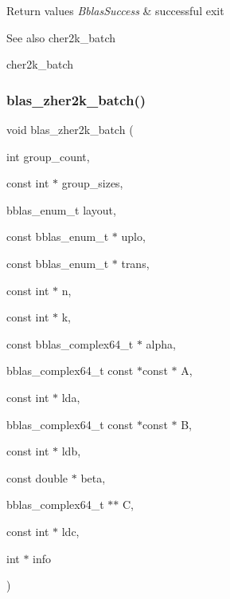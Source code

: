 \begin{DoxyRetVals}{Return values}
{\em Bblas\+Success} & successful exit\\
\hline
\end{DoxyRetVals}
\begin{DoxySeeAlso}{See also}
cher2k\+\_\+batch 

cher2k\+\_\+batch 
\end{DoxySeeAlso}
\mbox{\label{group__her2k__batch_ga5a446eb5bdf3a533959c4f1fb2247973}} 
\subsubsection{\texorpdfstring{blas\+\_\+zher2k\+\_\+batch()}{blas\_zher2k\_batch()}}
{\footnotesize\ttfamily void blas\+\_\+zher2k\+\_\+batch (\begin{DoxyParamCaption}\item[{int}]{group\+\_\+count,  }\item[{const int $\ast$}]{group\+\_\+sizes,  }\item[{bblas\+\_\+enum\+\_\+t}]{layout,  }\item[{const bblas\+\_\+enum\+\_\+t $\ast$}]{uplo,  }\item[{const bblas\+\_\+enum\+\_\+t $\ast$}]{trans,  }\item[{const int $\ast$}]{n,  }\item[{const int $\ast$}]{k,  }\item[{const bblas\+\_\+complex64\+\_\+t $\ast$}]{alpha,  }\item[{bblas\+\_\+complex64\+\_\+t const $\ast$const $\ast$}]{A,  }\item[{const int $\ast$}]{lda,  }\item[{bblas\+\_\+complex64\+\_\+t const $\ast$const $\ast$}]{B,  }\item[{const int $\ast$}]{ldb,  }\item[{const double $\ast$}]{beta,  }\item[{bblas\+\_\+complex64\+\_\+t $\ast$$\ast$}]{C,  }\item[{const int $\ast$}]{ldc,  }\item[{int $\ast$}]{info }\end{DoxyParamCaption})}


